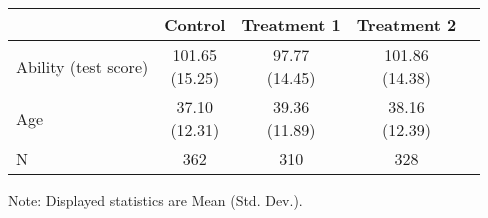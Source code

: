 \renewcommand\cellalign{t}
\begin{threeparttable}
\begin{tabular}{lcccc}
\toprule
 & Control & Treatment 1 & Treatment 2 \\
\midrule
\addlinespace
Ability (test score) & \makecell{101.65\\(15.25)} & \makecell{97.77\\(14.45)} & \makecell{101.86\\(14.38)} \\
Age & \makecell{37.10\\(12.31)} & \makecell{39.36\\(11.89)} & \makecell{38.16\\(12.39)} \\
\midrule
\addlinespace
N & 362 & 310 & 328 \\
\bottomrule
\end{tabular}
\footnotesize Note: Displayed statistics are Mean (Std. Dev.).
\end{threeparttable}